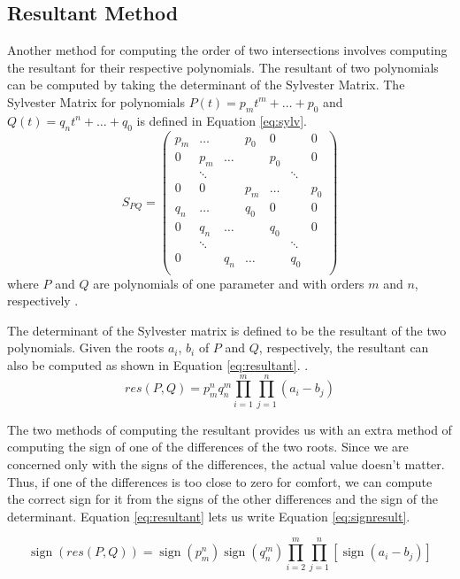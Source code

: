 \documentclass{cccg16}
\DeclareMathOperator{\sign}{sign}
\begin{document}
\subsection{Resultant Method}
Another method for computing the order of two intersections involves
computing the resultant for their respective polynomials.  The
resultant of two polynomials can be computed by taking the determinant
of the Sylvester Matrix.  The Sylvester Matrix for polynomials
$P(t)=p_m t^m + \dots + p_0$ and $Q(t)=q_n t^n + \dots + q_0$ is
defined in Equation \ref{eq:sylv}.
\begin{equation}
  S_{PQ}=\begin{pmatrix}
    p_m & \dots & & p_0 & 0 & & 0\\
    0 & p_m & \dots & & p_0 & & 0\\
    & \ddots & & & & \ddots\\
    0 & 0 & & p_m & \dots & & p_0\\
    q_n & \dots & & q_0 & 0 & & 0\\
    0 & q_n & \dots & & q_0 & & 0\\
    & \ddots & & & & \ddots\\
    0 & & q_n & \dots & & q_0\\
  \end{pmatrix}
  \label{eq:sylv}
\end{equation}
where $P$ and $Q$ are polynomials of one parameter and with orders $m$
and $n$, respectively \cite[Section~3.5]{cheeyap}.

The determinant of the Sylvester matrix is defined to be the resultant
of the two polynomials.  Given the roots $a_i$, $b_i$ of $P$ and $Q$,
respectively, the resultant can also be computed as shown in Equation
\ref{eq:resultant}. \cite[Section~6.4]{cheeyap}.
\begin{equation}
  res(P, Q)=p_m^n q_n^m \prod_{i=1}^m\prod_{j=1}^n (a_i-b_j)
  \label{eq:resultant}
\end{equation}

The two methods of computing the resultant provides us with an extra
method of computing the sign of one of the differences of the two
roots.  Since we are concerned only with the signs of the differences,
the actual value doesn't matter.  Thus, if one of the differences is
too close to zero for comfort, we can compute the correct sign for it
from the signs of the other differences and the sign of the
determinant.  Equation \ref{eq:resultant} lets us write Equation
\ref{eq:signresult}.

\begin{equation}
  \sign(res(P, Q)) =
  \sign(p_m^n)\sign(q_n^m)\prod_{i=2}^m\prod_{j=1}^n[\sign(a_i-b_j)]
  \label{eq:signresult}
\end{equation}
\end{document}

